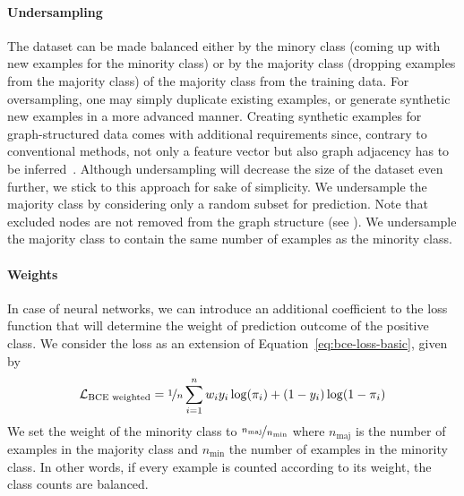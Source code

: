 \documentclass[
	fontsize=10pt, %
	twoside=true, %
	secnumdepth=1, %
  toc=indentunnumbered %
]{kaobook}
\begin{document}

\paragraph{Undersampling}
The dataset can be made balanced 
either by  the minory class (coming up with new examples for
the minority class) or by  the majority class (dropping
examples from the majority class) of the majority class from the training data.
For oversampling, one may simply duplicate existing examples, or generate
synthetic new examples in a more advanced manner. Creating synthetic examples
for graph-structured data comes with additional requirements since, contrary to
conventional methods, not only a feature vector but also graph adjacency has to
be inferred~\cite{zhao_GraphSMOTEImbalancedNode_2021}. Although undersampling
will decrease the size of the dataset even further, we stick to this approach
for sake of simplicity.
%
We undersample the majority class by considering only a random subset for
prediction. Note that excluded nodes are not removed from the graph structure (see
). We undersample the majority class to contain
the same number of examples as the minority class.


\paragraph{Weights} In case of neural networks, we can introduce an additional
coefficient to the loss function that will determine the weight of prediction
outcome of the positive class.
%
We consider the  loss as
an extension of Equation~\ref{eq:bce-loss-basic}, given by
\begin{align}
  \label{eq:bce-loss-weighted}
  \mathcal{L}_{\text{BCE weighted}} = \nicefrac{1}{n} \sum_{i=1}^n w_i y_i \log(\pi_i) + (1-y_i) \log (1-\pi_i)
\end{align}
We set the weight of the minority class to
$\nicefrac{n_{\text{maj}}}{n_{\text{min}}}$ where $n_{\text{maj}}$ is the number
of examples in the majority
class and $n_{\text{min}}$ the number of examples in the minority class. In
other words, if every example is counted according to its weight, the class
counts are balanced.
\end{document}
